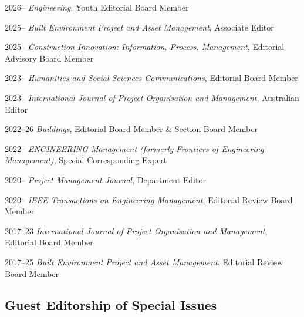 \documentclass[11pt,a4paper]{report} %
\begin{document}
    \begin{tablist}

        \item[2026--] \tab{}\textit{Engineering}, Youth Editorial Board Member
        
        \item[2025--] \tab{}\textit{Built Environment Project and Asset Management}, Associate Editor
        
        \item[2025--] \tab{}\textit{Construction Innovation: Information, Process, Management}, Editorial Advisory Board Member
        
        \item[2023--] \tab{}\textit{Humanities and Social Sciences Communications}, Editorial Board Member
        
        \item[2023--] \tab{}\textit{International Journal of Project Organisation and Management}, Australian Editor
        
        \item[2022--26] \tab{}\textit{Buildings}, Editorial Board Member \& Section Board Member
        
        \item[2022--] \tab{}\textit{ENGINEERING Management (formerly Frontiers of Engineering Management)}, Special Corresponding Expert

        \item[2020--] \tab{}\textit{Project Management Journal}, Department Editor

        \item[2020--] \tab{}\textit{IEEE Transactions on Engineering Management}, Editorial Review Board Member        
        
        \item[2017--23] \tab{}\textit{International Journal of Project Organisation and Management}, Editorial Board Member

        \item[2017--25] \tab{}\textit{Built Environment Project and Asset Management}, Editorial Review Board Member  

    \end{tablist}

    \subsection*{Guest Editorship of Special Issues}
\end{document}
